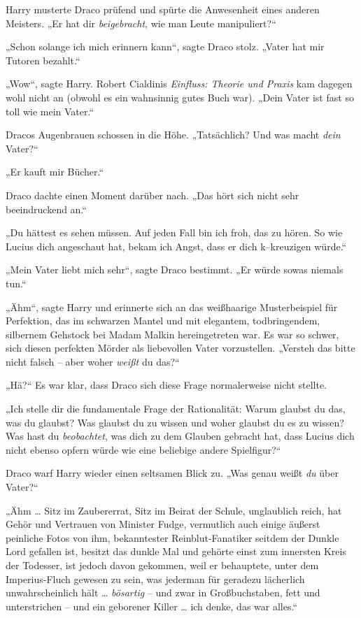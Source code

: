 {Harry musterte Draco prüfend und spürte die Anwesenheit eines anderen Meisters. „Er hat dir \emph{beigebracht}, wie man Leute manipuliert?“

„Schon solange ich mich erinnern kann“, sagte Draco stolz. „Vater hat mir Tutoren bezahlt.“

„Wow“, sagte Harry. Robert Cialdinis \emph{Einfluss: Theorie und Praxis} kam dagegen wohl nicht an (obwohl es ein wahnsinnig gutes Buch war). „Dein Vater ist fast so toll wie mein Vater.“

Dracos Augenbrauen schossen in die Höhe. „Tatsächlich? Und was macht \emph{dein} Vater?“

„Er kauft mir Bücher.“

Draco dachte einen Moment darüber nach. „Das hört sich nicht sehr beeindruckend an.“

„Du hättest es sehen müssen. Auf jeden Fall bin ich froh, das zu hören. So wie Lucius dich angeschaut hat, bekam ich Angst, dass er dich k--kreuzigen würde.“

„Mein Vater liebt mich sehr“, sagte Draco bestimmt. „Er würde sowas niemals tun.“

„Ähm“, sagte Harry und erinnerte sich an das weißhaarige Musterbeispiel für Perfektion, das im schwarzen Mantel und mit elegantem, todbringendem, silbernem Gehstock bei Madam Malkin hereingetreten war. Es war so schwer, sich diesen perfekten Mörder als liebevollen Vater vorzustellen. „Versteh das bitte nicht falsch -- aber woher \emph{weißt} du das?“

„Hä?“ Es war klar, dass Draco sich diese Frage normalerweise nicht stellte.

„Ich stelle dir die fundamentale Frage der Rationalität: Warum glaubst du das, was du glaubst? Was glaubst du zu wissen und woher glaubst du es zu wissen? Was hast du \emph{beobachtet}, was dich zu dem Glauben gebracht hat, dass Lucius dich nicht ebenso opfern würde wie eine beliebige andere Spielfigur?“

Draco warf Harry wieder einen seltsamen Blick zu. „Was genau weißt \emph{du} über Vater?“

„Ähm … Sitz im Zaubererrat, Sitz im Beirat der Schule, unglaublich reich, hat Gehör und Vertrauen von Minister Fudge, vermutlich auch einige äußerst peinliche Fotos von ihm, bekanntester Reinblut-Fanatiker seitdem der Dunkle Lord gefallen ist, besitzt das dunkle Mal und gehörte einst zum innersten Kreis der Todesser, ist jedoch davon gekommen, weil er behauptete, unter dem Imperius-Fluch gewesen zu sein, was jederman für geradezu lächerlich unwahrscheinlich hält … \emph{bösartig} -- und zwar in Großbuchstaben, fett und unterstrichen -- und ein geborener Killer … ich denke, das war alles.“

}
